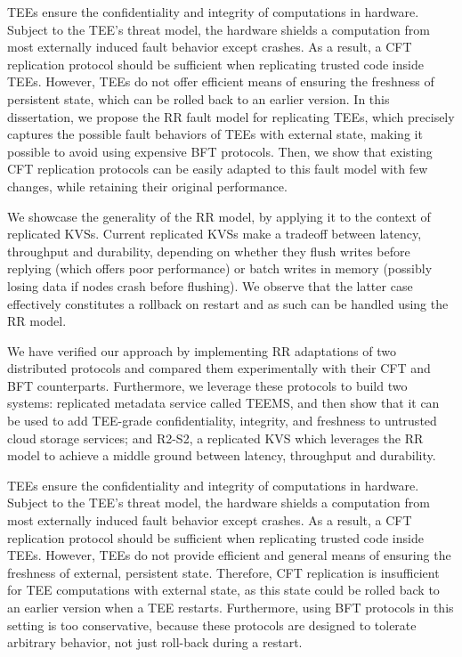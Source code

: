 \acresetall

\noindent \acfp{TEE} ensure the confidentiality and integrity of
computations in hardware. Subject to the \ac{TEE}'s threat model,
the hardware shields a computation from most externally induced
fault behavior except crashes. As a result, a \acs{CFT}
replication protocol should be sufficient when replicating
trusted code inside \acp{TEE}. However, \acp{TEE} do not offer
efficient means of ensuring the freshness of persistent state,
which can be rolled back to an earlier version. In this
dissertation, we propose the \acf{RR} fault model for replicating
\acp{TEE}, which precisely captures the possible fault behaviors
of \acp{TEE} with external state, making it possible to avoid
using expensive \acs{BFT} protocols. Then, we show that existing
\acs{CFT} replication protocols can be easily adapted to this fault model
with few changes, while retaining their original performance.

\noindent We showcase the generality of the \ac{RR} model,
by applying it to the context of replicated \acsp{KVS}.
Current replicated \acsp{KVS} make a tradeoff
between latency, throughput and durability, depending on whether
they flush writes before replying (which offers poor
performance) or batch writes in memory (possibly losing data if
nodes crash before flushing). We observe that the latter case effectively
constitutes a rollback on restart and as such can be handled
using the \ac{RR} model.

\noindent We have verified our approach by implementing \ac{RR}
adaptations of two distributed protocols and compared
them experimentally with their \acs{CFT} and \acs{BFT}
counterparts. Furthermore, we
leverage these protocols to build two systems: replicated metadata service called
\acs{TEEMS}, and then show that it can be used to add \ac{TEE}-grade
confidentiality, integrity, and freshness to untrusted cloud storage
services; and \acs{R2-S2}, a replicated \acs{KVS}
which leverages the \ac{RR} model to achieve a middle ground between latency,
throughput and durability.


\noindent \acfp{TEE} ensure the confidentiality and
integrity of computations in hardware. Subject to the \ac{TEE}'s threat
model, the hardware shields a computation from most externally induced
fault behavior except crashes. As a result, a \acf{CFT} replication protocol should be sufficient when replicating
trusted code inside \acp{TEE}.  However, \acp{TEE} do not provide efficient and
general means of ensuring the freshness of external, persistent
state. Therefore, \ac{CFT} replication is insufficient for
\ac{TEE} computations
with external state, as this state could be rolled back to an earlier
version when a \ac{TEE} restarts.  Furthermore, using \acf{BFT} protocols in this
setting is too conservative, because these protocols are designed to
tolerate arbitrary behavior, not just roll-back during a restart.

